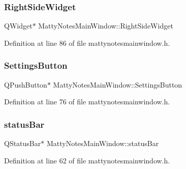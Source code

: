 \subsubsection{\texorpdfstring{Right\+Side\+Widget}{RightSideWidget}}
{\footnotesize\ttfamily Q\+Widget$\ast$ Matty\+Notes\+Main\+Window\+::\+Right\+Side\+Widget\hspace{0.3cm}{\ttfamily [private]}}



Definition at line 86 of file mattynotesmainwindow.\+h.

\hypertarget{classMattyNotesMainWindow_ad9cb13412434d6fc084b5ead14b48356}{}\label{classMattyNotesMainWindow_ad9cb13412434d6fc084b5ead14b48356} 
\subsubsection{\texorpdfstring{Settings\+Button}{SettingsButton}}
{\footnotesize\ttfamily Q\+Push\+Button$\ast$ Matty\+Notes\+Main\+Window\+::\+Settings\+Button\hspace{0.3cm}{\ttfamily [private]}}



Definition at line 76 of file mattynotesmainwindow.\+h.

\hypertarget{classMattyNotesMainWindow_acccc534f50bac336cd6fabdba5406c12}{}\label{classMattyNotesMainWindow_acccc534f50bac336cd6fabdba5406c12} 
\subsubsection{\texorpdfstring{status\+Bar}{statusBar}}
{\footnotesize\ttfamily Q\+Status\+Bar$\ast$ Matty\+Notes\+Main\+Window\+::status\+Bar\hspace{0.3cm}{\ttfamily [private]}}



Definition at line 62 of file mattynotesmainwindow.\+h.

\hypertarget{classMattyNotesMainWindow_a77eaa70bd33b9a31f6d3fe0aa5669190}{}\label{classMattyNotesMainWindow_a77eaa70bd33b9a31f6d3fe0aa5669190} 
